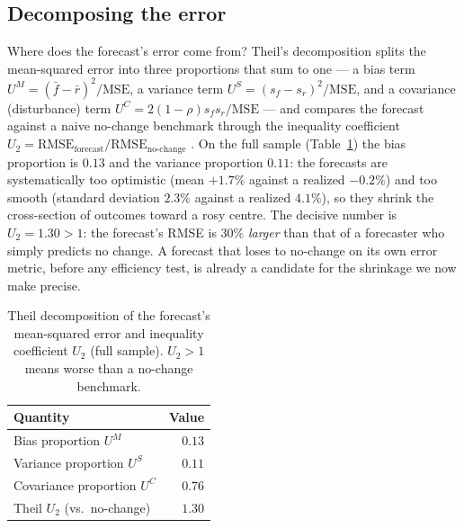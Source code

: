 \documentclass[10pt,twocolumn,twoside]{eec_style}
\newcommand{\tab}[1]{Table~\ref{tab:#1}}
\begin{document}
\subsection{Decomposing the error}
\label{sec:theil}
Where does the forecast's error come from? Theil's decomposition splits the
mean-squared error into three proportions that sum to one --- a bias term
$U^M=(\bar f-\bar r)^2/\mathrm{MSE}$, a variance term $U^S=(s_f-s_r)^2/\mathrm{MSE}$,
and a covariance (disturbance) term $U^C=2(1-\rho)s_f s_r/\mathrm{MSE}$ --- and compares
the forecast against a naive no-change benchmark through the inequality coefficient
$U_2=\mathrm{RMSE}_{\text{forecast}}/\mathrm{RMSE}_{\text{no-change}}$ \cite{theil1966}.
On the full sample (\tab{theil}) the bias proportion is $0.13$ and the variance
proportion $0.11$: the forecasts are systematically too optimistic (mean $+1.7\%$
against a realized $-0.2\%$) and too smooth (standard deviation $2.3\%$ against a
realized $4.1\%$), so they shrink the cross-section of outcomes toward a rosy centre.
The decisive number is $U_2=1.30>1$: the forecast's RMSE is $30\%$ \emph{larger} than
that of a forecaster who simply predicts no change. A forecast that loses to no-change
on its own error metric, before any efficiency test, is already a candidate for the
shrinkage we now make precise.

\begin{table}[!t]
\footnotesize
\centering
\caption{Theil decomposition of the forecast's mean-squared error and inequality
coefficient $U_2$ (full sample). $U_2>1$ means worse than a no-change benchmark.}
\label{tab:theil}
\vspace{2pt}
\begin{tabular}{lr}
\toprule
Quantity & Value \\
\midrule
Bias proportion $U^M$        & $0.13$ \\
Variance proportion $U^S$    & $0.11$ \\
Covariance proportion $U^C$  & $0.76$ \\
Theil $U_2$ (vs.\ no-change) & $1.30$ \\
\bottomrule
\end{tabular}
\end{table}

\end{document}
